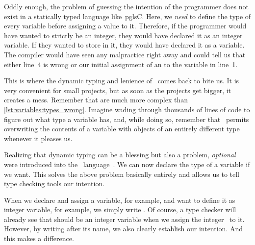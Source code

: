 Oddly enough, the problem of guessing the intention of the programmer does not exist in a statically typed language like~pgls{C}.
Here, we \emph{need} to define the type of every variable before assigning a value to it.
Therefore, if the programmer would have wanted  to strictly be an integer, they would have declared it as an integer variable.
If they wanted to store  in it, they would have declared it as a  variable.
The compiler would have seen any malpractice right away and could tell us that either line~4 is wrong or our initial assignment of an  to the variable in line~1.

This is where the dynamic typing and lenience of \python\ comes back to bite us.
It is very convenient for small projects, but as soon as the projects get bigger, it creates a mess.
Remember that  are much more complex than \cref{lst:variables:types_wrong}.
Imagine wading through thousands of lines of code to figure out what type a variable has, and, while doing so, remember that \python\ permits overwriting the contents of a variable with objects of an entirely different type whenever it pleases us.

Realizing that dynamic typing can be a blessing but also a problem, \emph{optional}  were introduced into the \python\ language~\cite{PEP484,R2023PTHATCPBNI}.
We can now declare the type of a variable if we want.
This solves the above problem basically entirely and allows us to tell type checking tools our intention.

When we declare and assign a variable,  for example, and want to define it as integer variable, for example, we simply write .
Of course, a type checker will already see that  should be an integer variable when we assign the integer~ to it.
However, by writing \pythonIdx{:} after its name, we also clearly establish our intention.
And this makes a difference.

%
%
%
%
%


